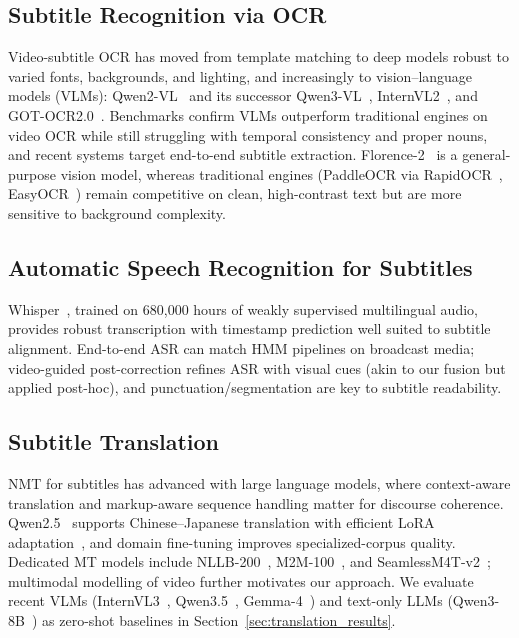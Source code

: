 \documentclass[mathematics,article,submit,xetex,moreauthors]{Definitions/mdpi}
\begin{document}
\subsection{Subtitle Recognition via OCR}
Video-subtitle OCR has moved from template matching to deep models robust to varied fonts, backgrounds, and lighting, and increasingly to vision--language models (VLMs): Qwen2-VL~\cite{wang2024qwen2} and its successor Qwen3-VL~\cite{qwen3vl2025}, InternVL2~\cite{chen2024internvl}, and GOT-OCR2.0~\cite{wang2024gotocr}.
Benchmarks confirm VLMs outperform traditional engines on video OCR while still struggling with temporal consistency and proper nouns, and recent systems target end-to-end subtitle extraction.
Florence-2~\cite{florence2_2024} is a general-purpose vision model, whereas traditional engines (PaddleOCR via RapidOCR~\cite{rapidocr2022}, EasyOCR~\cite{easyocr2020}) remain competitive on clean, high-contrast text but are more sensitive to background complexity.

\subsection{Automatic Speech Recognition for Subtitles}
Whisper~\cite{radford2023robust}, trained on 680{,}000 hours of weakly supervised multilingual audio, provides robust transcription with timestamp prediction well suited to subtitle alignment.
End-to-end ASR can match HMM pipelines on broadcast media; video-guided post-correction refines ASR with visual cues (akin to our fusion but applied post-hoc), and punctuation/segmentation are key to subtitle readability.

\subsection{Subtitle Translation}
NMT for subtitles has advanced with large language models, where context-aware translation and markup-aware sequence handling matter for discourse coherence.
Qwen2.5~\cite{yang2024qwen2} supports Chinese--Japanese translation with efficient LoRA adaptation~\cite{hu2022lora}, and domain fine-tuning improves specialized-corpus quality.
Dedicated MT models include NLLB-200~\cite{nllb2022}, M2M-100~\cite{fan2021beyond}, and SeamlessM4T-v2~\cite{seamless2023}; multimodal modelling of video further motivates our approach.
We evaluate recent VLMs (InternVL3~\cite{chen2024internvl}, Qwen3.5~\cite{qwen35_2025}, Gemma-4~\cite{gemma2025}) and text-only LLMs (Qwen3-8B~\cite{qwen3_2025}) as zero-shot baselines in Section~\ref{sec:translation_results}.
\end{document}
